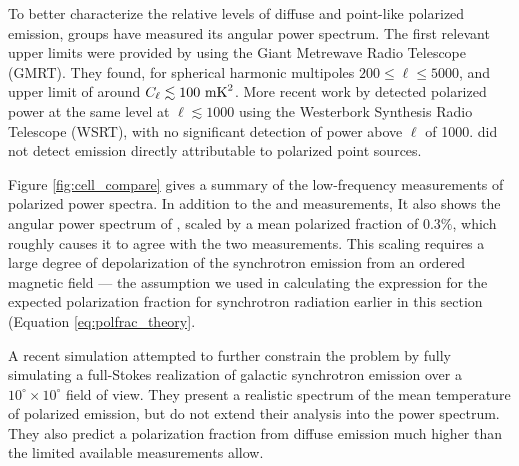 To better characterize the relative levels of diffuse and point-like polarized emission, groups have
measured its angular power spectrum. The first relevant upper limits were provided by
\citet{Pen2009} using the Giant Metrewave Radio Telescope
(GMRT). They found, for spherical harmonic multipoles $200\le \ell \le 5000$,
and upper limit of around $C_\ell \lesssim 100\ {\rm mK}^2$. More recent work by
\citet{Bernardi2010} detected polarized power at the same level at $\ell \lesssim 1000$ using the
Westerbork Synthesis Radio Telescope (WSRT), with no significant detection of power above $\ell$ of 1000. \citet{Bernardi2010} did
not detect emission directly attributable to polarized point sources. 

Figure \ref{fig:cell_compare} gives a summary of the low-frequency measurements of polarized power
spectra. In addition to the \citet{Pen2009} and \citet{Bernardi2010} measurements, It also 
shows the angular power spectrum of \citet{Haslam}, scaled by a mean
polarized fraction of $0.3\%$, which roughly causes it to agree with the two measurements. This
scaling requires a large degree of depolarization of the synchrotron emission from an ordered
magnetic field --- the assumption we used in calculating the expression for the expected
polarization fraction for synchrotron radiation earlier in this section (Equation
\ref{eq:polfrac_theory}.

A recent simulation \cite{Jelic2010} attempted to further constrain the problem by fully simulating
a full-Stokes realization of galactic synchrotron emission over a $10^\circ\times10^\circ$ field of
view. They present a realistic spectrum of the mean temperature of polarized emission, but do not
extend their analysis into the power spectrum. They also predict a polarization fraction
from diffuse emission much higher than the limited available measurements allow.

